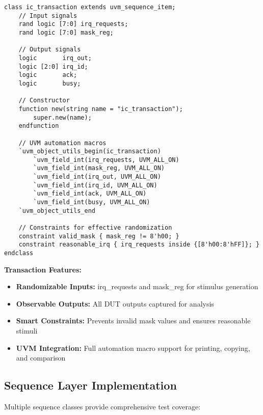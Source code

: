 \documentclass[12pt,a4paper]{article}
\begin{document}
\begin{lstlisting}[caption=Complete Transaction Class, label=lst:transaction]
class ic_transaction extends uvm_sequence_item;
    // Input signals
    rand logic [7:0] irq_requests;
    rand logic [7:0] mask_reg;
    
    // Output signals
    logic       irq_out;
    logic [2:0] irq_id;
    logic       ack;
    logic       busy;

    // Constructor
    function new(string name = "ic_transaction");
        super.new(name);
    endfunction

    // UVM automation macros
    `uvm_object_utils_begin(ic_transaction)
        `uvm_field_int(irq_requests, UVM_ALL_ON)
        `uvm_field_int(mask_reg, UVM_ALL_ON)
        `uvm_field_int(irq_out, UVM_ALL_ON)
        `uvm_field_int(irq_id, UVM_ALL_ON)
        `uvm_field_int(ack, UVM_ALL_ON)
        `uvm_field_int(busy, UVM_ALL_ON)
    `uvm_object_utils_end

    // Constraints for effective randomization
    constraint valid_mask { mask_reg != 8'h00; }
    constraint reasonable_irq { irq_requests inside {[8'h00:8'hFF]}; }
endclass
\end{lstlisting}

\textbf{Transaction Features:}
\begin{itemize}
    \item \textbf{Randomizable Inputs:} irq\_requests and mask\_reg for stimulus generation
    \item \textbf{Observable Outputs:} All DUT outputs captured for analysis
    \item \textbf{Smart Constraints:} Prevents invalid mask values and ensures reasonable stimuli
    \item \textbf{UVM Integration:} Full automation macro support for printing, copying, and comparison
\end{itemize}

\subsection{Sequence Layer Implementation}
Multiple sequence classes provide comprehensive test coverage:
\end{document}
